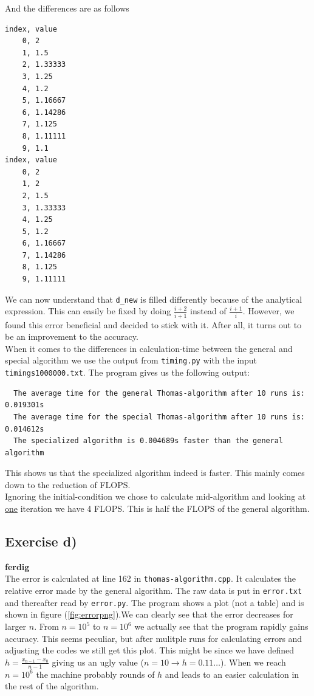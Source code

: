 \documentclass{article}
\begin{document}
  And the differences are as follows

  \begin{verbatim}
index, value
    0, 2
    1, 1.5
    2, 1.33333
    3, 1.25
    4, 1.2
    5, 1.16667
    6, 1.14286
    7, 1.125
    8, 1.11111
    9, 1.1
index, value
    0, 2
    1, 2
    2, 1.5
    3, 1.33333
    4, 1.25
    5, 1.2
    6, 1.16667
    7, 1.14286
    8, 1.125
    9, 1.11111
  \end{verbatim}

  We can now understand that \texttt{d\_new} is filled differently because of the analytical expression. This can easily be fixed by doing $\frac{i+2}{i+1}$ instead of $\frac{i+1}{i}$. However, we found this error beneficial and decided to stick with it. After all, it turns out to be an improvement to the accuracy. \\

  When it comes to the differences in calculation-time between the general and special algorithm we use the output from \texttt{timing.py} with the input \texttt{timings1000000.txt}. The program gives us the following output:

  \begin{verbatim}
  The average time for the general Thomas-algorithm after 10 runs is: 0.019301s
  The average time for the special Thomas-algorithm after 10 runs is: 0.014612s
  The specialized algorithm is 0.004689s faster than the general algorithm
  \end{verbatim}

  This shows us that the specialized algorithm indeed is faster. This mainly comes down to the reduction of FLOPS.\\

  Ignoring the initial-condition we chose to calculate mid-algorithm and looking at \underline{one} iteration we have 4 FLOPS. This is half the FLOPS of the general algorithm.

  \subsection{Exercise d)} \label{sec:Results d)}

  {\bf ferdig} \\

  The error is calculated at line 162 in \texttt{thomas-algorithm.cpp}. It calculates the relative error made by the general algorithm. The raw data is put in \texttt{error.txt} and thereafter read by \texttt{error.py}. The program shows a plot (not a table) and is shown in figure (\ref{fig:errorpng}).We can clearly see that the error decreases for larger $n$. From $n=10^5$ to $n=10^6$ we actually see that the program rapidly gains accuracy. This seems peculiar, but after mulitple runs for calculating errors and adjusting the codes we still get this plot. This might be since we have defined $h=\frac{x_{n-1}-x_0}{n-1}$ giving us an ugly value ($n=10 \rightarrow{} h=0.11 \hdots$). When we reach $n=10^6$ the machine probably rounds of $h$ and leads to an easier calculation in the rest of the algorithm.\\
\end{document}
